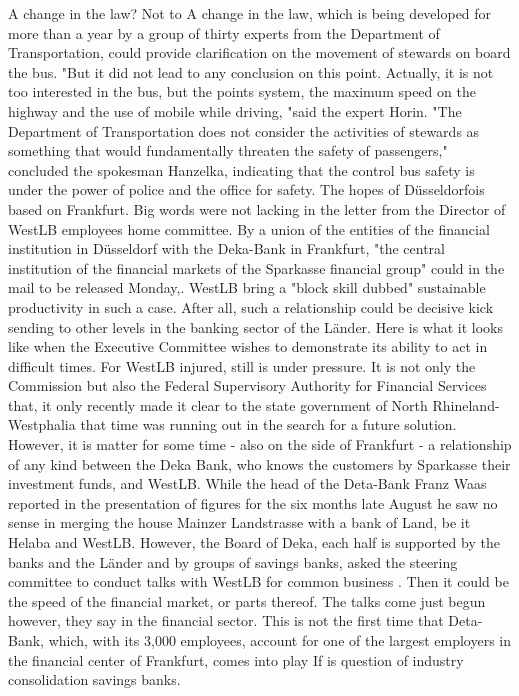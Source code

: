 A change in the law?
Not to
A change in the law, which is being developed for more than a year by a group of thirty experts from the Department of Transportation, could provide clarification on the movement of stewards on board the bus.
"But it did not lead to any conclusion on this point.
Actually, it is not too interested in the bus, but the points system, the maximum speed on the highway and the use of mobile while driving, "said the expert Horin.
"The Department of Transportation does not consider the activities of stewards as something that would fundamentally threaten the safety of passengers," concluded the spokesman Hanzelka, indicating that the control bus safety is under the power of police and the office for safety.
The hopes of Düsseldorfois based on Frankfurt.
Big words were not lacking in the letter from the Director of WestLB employees home committee.
By a union of the entities of the financial institution in Düsseldorf with the Deka-Bank in Frankfurt, "the central institution of the financial markets of the Sparkasse financial group" could in the mail to be released Monday,.
WestLB bring a "block skill dubbed" sustainable productivity in such a case.
After all, such a relationship could be decisive kick sending to other levels in the banking sector of the Länder.
Here is what it looks like when the Executive Committee wishes to demonstrate its ability to act in difficult times.
For WestLB injured, still is under pressure.
It is not only the Commission but also the Federal Supervisory Authority for Financial Services that, it only recently made it clear to the state government of North Rhineland-Westphalia that time was running out in the search for a future solution.
However, it is matter for some time - also on the side of Frankfurt - a relationship of any kind between the Deka Bank, who knows the customers by Sparkasse their investment funds, and WestLB.
While the head of the Deta-Bank Franz Waas reported in the presentation of figures for the six months late August he saw no sense in merging the house Mainzer Landstrasse with a bank of Land, be it Helaba and WestLB.
However, the Board of Deka, each half is supported by the banks and the Länder and by groups of savings banks, asked the steering committee to conduct talks with WestLB for common business .
Then it could be the speed of the financial market, or parts thereof.
The talks come just begun however, they say in the financial sector.
This is not the first time that Deta-Bank, which, with its 3,000 employees, account for one of the largest employers in the financial center of Frankfurt, comes into play If is question of industry consolidation savings banks.
